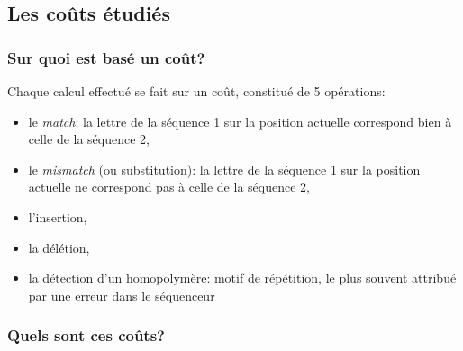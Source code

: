 \documentclass[12pt]{report}
\begin{document}
\begin{spacing}{1.2}
\subsection{Les coûts étudiés}

\subsubsection{Sur quoi est basé un coût?}

Chaque calcul effectué se fait sur un coût, constitué de 5 opérations:
\begin{itemize}
\item{le \textit{match}: la lettre de la séquence 1 sur la position actuelle correspond bien à celle de la séquence 2,}
\item{le \textit{mismatch} (ou substitution): la lettre de la séquence 1 sur la position actuelle ne correspond pas à celle de la séquence 2,}
\item{l'insertion,}
\item{la délétion,}
\item{la détection d'un homopolymère: motif de répétition, le plus souvent attribué par une erreur dans le séquenceur}
\end{itemize}

\subsubsection{Quels sont ces coûts?}


\end{spacing}
\end{document}
